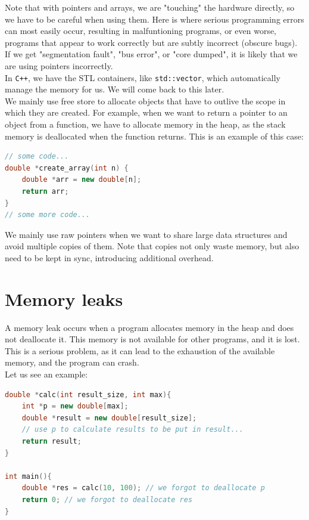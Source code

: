 Note that with pointers and arrays, we are "touching" the hardware directly, so we have to be careful when using them.
Here is where serious programming errors can most easily occur, resulting in malfuntioning programs, or even worse,
programs that appear to work correctly but are subtly incorrect (obscure bugs). If we get "segmentation fault",
"bus error", or "core dumped", it is likely that we are using pointers incorrectly.\\

In \texttt{C++}, we have the STL containers, like \texttt{std::vector}, which automatically manage 
the memory for us. We will come back to this later.\\

We mainly use free store to allocate objects that have to outlive the scope in which they are created. For example, when we
want to return a pointer to an object from a function, we have to allocate memory in the heap, as the stack memory is deallocated
when the function returns. This is an example of this case:\\

\begin{lstlisting}[language=C++]
// some code...
double *create_array(int n) {
    double *arr = new double[n];
    return arr;
}
// some more code...
\end{lstlisting}

We mainly use raw pointers when we want to share large data structures and avoid multiple copies of them. Note that copies not only waste
memory, but also need to be kept in sync, introducing additional overhead.

\section{Memory leaks}

A memory leak occurs when a program allocates memory in the heap and does not deallocate it. This memory is not available for
other programs, and it is lost. This is a serious problem, as it can lead to the exhaustion of the available memory, and the program
can crash.\\

Let us see an example:

\begin{lstlisting}[language=C++]
double *calc(int result_size, int max){
    int *p = new double[max];
    double *result = new double[result_size];
    // use p to calculate results to be put in result...
    return result;
}

int main(){
    double *res = calc(10, 100); // we forgot to deallocate p
    return 0; // we forgot to deallocate res
}
\end{lstlisting}

